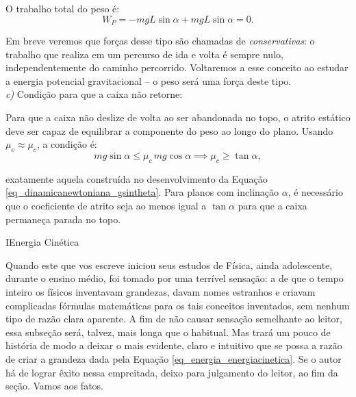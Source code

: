 \begin{exemplo}
O trabalho total do peso é:
%
\begin{equation*}
    \boxed{W_P = -mgL\sin\alpha + mgL\sin\alpha = 0.}
\end{equation*}
 
Em breve veremos que forças desse tipo são chamadas de \textit{conservativas}: o trabalho que realiza em um percurso de
ida e volta é sempre nulo, independentemente do caminho percorrido. Voltaremos a
esse conceito ao estudar a energia potencial gravitacional -- o peso será uma força deste tipo. \\
 
\textit{c)} Condição para que a caixa não retorne:
 
Para que a caixa não deslize de volta ao ser abandonada no topo, o atrito estático
deve ser capaz de equilibrar a componente do peso ao longo do plano. Usando
$\mu_e \approx \mu_c$, a condição é:
%
\begin{equation*}
    mg\sin\alpha \leq \mu_c\, mg\cos\alpha \implies \boxed{\mu_c \geq \tan\alpha,}
\end{equation*}

\noindent exatamente aquela construída no desenvolvimento da Equação \eqref{eq_dinamicanewtoniana_gsintheta}. Para planos com inclinação $\alpha$, é necessário que o coeficiente de atrito seja
ao menos igual a $\tan\alpha$ para que a caixa permaneça parada no topo.



\end{exemplo}


\vspace{0.3cm}











\begin{secnivel}{I}{Energia Cinética}
 

  
\end{secnivel}








Quando este que vos escreve iniciou seus estudos de Física, ainda adolescente, durante o ensino médio, foi tomado por uma terrível sensação: a de que o tempo inteiro os físicos inventavam grandezas, davam nomes estranhos e criavam complicadas fórmulas matemáticas para os tais conceitos inventados, sem nenhum tipo de razão clara aparente. A fim de não causar sensação semelhante ao leitor, essa subseção será, talvez, mais longa que o habitual. Mas trará um pouco de história de modo a deixar o mais evidente, claro e intuitivo que se possa a razão de criar a grandeza dada pela Equação \eqref{eq_energia_energiacinetica}. Se o autor há de lograr êxito nessa empreitada, deixo para julgamento do leitor, ao fim da seção. Vamos aos fatos.

